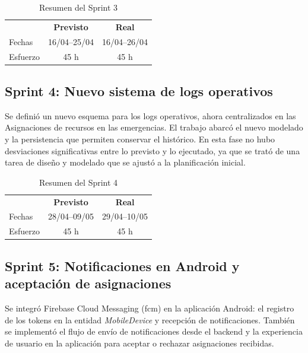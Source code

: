 \begin{table}[H]
  \centering
  \begin{tabular}{l|c|c}
    \rowcolor{udcpink!25}
    \textbf{} & \textbf{Previsto} & \textbf{Real} \\
    Fechas & 16/04--25/04 & 16/04--26/04 \\
    Esfuerzo & 45 h & 45 h \\
  \end{tabular}
  \caption{Resumen del Sprint 3}
  \label{tab:sprint3}
\end{table}

\subsection{Sprint 4: Nuevo sistema de logs operativos}

Se definió un nuevo esquema para los logs operativos, ahora centralizados en las Asignaciones de recursos en las emergencias. El trabajo abarcó el nuevo modelado y la persistencia que permiten conservar el histórico. En esta fase no hubo desviaciones significativas entre lo previsto y lo ejecutado, ya que se trató de una tarea de diseño y modelado que se ajustó a la planificación inicial.

\begin{table}[H]
  \centering
  \begin{tabular}{l|c|c}
    \rowcolor{udcpink!25}
    \textbf{} & \textbf{Previsto} & \textbf{Real} \\
    Fechas & 28/04--09/05 & 29/04--10/05 \\
    Esfuerzo & 45 h & 45 h \\
  \end{tabular}
  \caption{Resumen del Sprint 4}
  \label{tab:sprint4}
\end{table}

\subsection{Sprint 5: Notificaciones en Android y aceptación de asignaciones}
Se integró Firebase Cloud Messaging (\acrshort{fcm}) en la aplicación Android: el registro de los tokens en la entidad \textit{MobileDevice} y recepción de notificaciones. También se implementó el flujo de envío de notificaciones desde el backend y la experiencia de usuario en la aplicación para aceptar o rechazar asignaciones recibidas.

